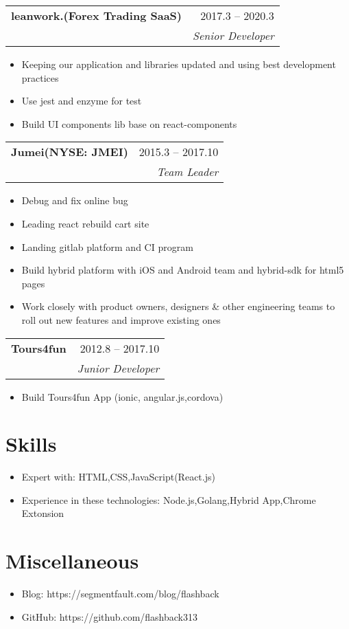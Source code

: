 \documentclass[letterpaper,11pt]{article}
\makeatletter
\newcommand{\resumeSubheading}[4]{
  \vspace{-2pt}\item
    \begin{tabular*}{0.97\textwidth}[t]{l@{\extracolsep{\fill}}r}
      \textbf{#1} & #2 \\
      \textit{\small #3} & \textit{\small #4} \\
    \end{tabular*}\vspace{-10pt}
}
\makeatother
\begin{document}
\resumeSubheading{\textbf{leanwork.(Forex Trading SaaS)}}{2017.3 -- 2020.3}
\role{Senior Developer}
\begin{itemize}
  \item Keeping our application and libraries updated and using best development practices
  \item Use jest and enzyme for test
  \item Build UI components lib base on react-components
\end{itemize}

\resumeSubheading{\textbf{Jumei(NYSE: JMEI)}}{2015.3 -- 2017.10}
\role{Team Leader}
\begin{itemize}
  \item Debug and fix online bug
  \item Leading react rebuild cart site
  \item Landing gitlab platform and CI program
  \item Build hybrid platform with iOS and Android team and hybrid-sdk for html5 pages 
  \item Work closely with product owners, designers & other engineering teams to roll out new features and improve existing ones
\end{itemize}

\resumeSubheading{\textbf{Tours4fun}}{2012.8 -- 2017.10}
\role{Junior Developer}
\begin{itemize}
  \item Build Tours4fun App (ionic, angular.js,cordova)
\end{itemize}

\section{Skills}
\begin{itemize}[parsep=0.5ex]
  \item Expert with: HTML,CSS,JavaScript(React.js)
  \item Experience in these technologies: Node.js,Golang,Hybrid App,Chrome Extonsion
\end{itemize}

\section{Miscellaneous}
\begin{itemize}[parsep=0.5ex]
  \item Blog: https://segmentfault.com/blog/flashback
  \item GitHub: https://github.com/flashback313
\end{itemize}

%
%
\end{document}
